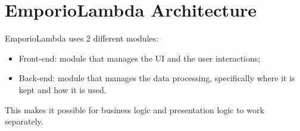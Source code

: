 \section{EmporioLambda Architecture}
EmporioLambda uses 2 different modules:
\begin{itemize}
\item Front-end: module that manages the UI and the user interactions;
\item Back-end: module that manages the data processing, specifically where it is kept and how it is used.
\end{itemize}
This makes it possible for business logic and presentation logic to work separately.


\newpage

\newpage

\newpage

\newpage

\newpage